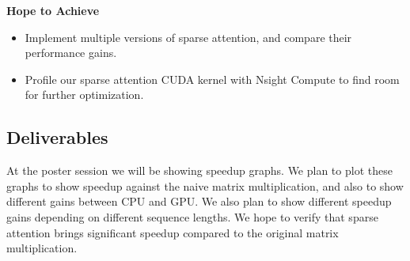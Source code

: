 \documentclass[11pt]{article}
\begin{document}
\textbf{Hope to Achieve}
\begin{itemize}
\itemsep 0em
    \item Implement multiple versions of sparse attention, and compare their performance gains.
    \item Profile our sparse attention CUDA kernel with Nsight Compute to find room for further optimization.
\end{itemize}




\subsection{Deliverables}
At the poster session we will be showing speedup graphs. 
We plan to plot these graphs to show speedup against the naive matrix multiplication, and also to show different gains between CPU and GPU.
We also plan to show different speedup gains depending on different sequence lengths. We hope to verify that sparse attention brings significant speedup compared to the original matrix multiplication.

\end{document}
